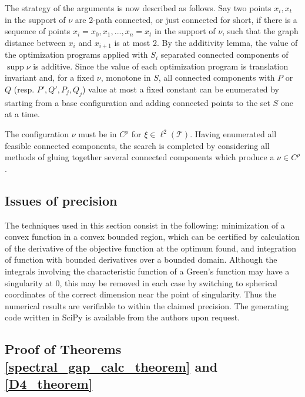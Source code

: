 \documentclass[a4paper, 12pt, notitlepage]{amsart}
\newcommand{\supp}{\operatorname{supp}}
\newcommand{\sT}{\mathscr{T}}
\theoremstyle{remark}
\begin{document}
The strategy of the arguments is now described as follows.  Say two points $x_i, x_t$ in the support of $\nu$ are  2-path connected, or just connected for short, if there is a sequence of points $x_i = x_0, x_1, ..., x_n = x_t$ in the support of $\nu$, such that the graph distance between $x_i$ and $x_{i+1}$ is at most 2. By the additivity lemma, the value of the optimization programs applied with $S_i$ separated connected components of $\supp \nu$ is additive.  Since the value of each optimization program is translation invariant and, for a fixed $\nu$, monotone in $S$, all connected components with $P$ or $Q$ (resp. $P', Q', P_j, Q_j$) value at most a fixed constant can be enumerated  by starting from a base configuration and adding connected points to the set $S$ one at a time.

The configuration $\nu$ must be in $C^\rho$ for $\xi \in \ell^2(\sT)$.  Having enumerated all feasible connected components, the search is completed by considering all methods of gluing together several connected components which produce a $\nu \in C^\rho$.  %

\subsection{Issues of precision}
The techniques used in this section consist in the following:
minimization of a convex function in a convex bounded region, which can be certified by calculation of the derivative of the objective function at the optimum found, and integration of function with bounded derivatives over a bounded domain.  Although the integrals involving the characteristic function of a Green's function may have a singularity at 0, this may be removed in each case by switching to spherical coordinates of the correct dimension near the point of singularity.  Thus the numerical results are verifiable to within the claimed precision.  The generating code written in SciPy is available from the authors upon request.  



\subsection{Proof of Theorems \ref{spectral_gap_calc_theorem} and \ref{D4_theorem}}
\end{document}
